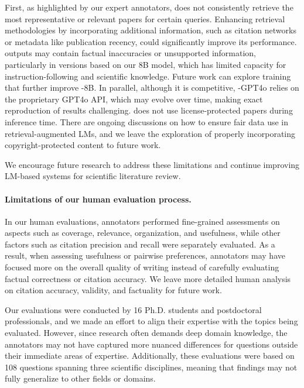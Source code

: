 First, as highlighted by our expert annotators, \model does not consistently retrieve the most representative or relevant papers for certain queries. Enhancing retrieval methodologies by incorporating additional information, such as citation networks or metadata like publication recency, could significantly improve its performance. 
\model outputs may contain factual inaccuracies or unsupported information, particularly in versions based on our 8B model, which has limited capacity for instruction-following and scientific knowledge.  
Future work can explore training that further improve \model-8B. 
In parallel, although it is competitive, \model-GPT4o relies on the proprietary GPT4o API, which may evolve over time, making exact reproduction of results challenging. 
\model does not use license-protected papers during inference time. 
There are ongoing discussions on how to ensure fair data use in retrieval-augmented LMs, and we leave the exploration of properly incorporating copyright-protected content to future work. 

We encourage future research to address these limitations and continue improving LM-based systems for scientific literature review. 



\paragraph{Limitations of our human evaluation process.}
In our human evaluations, annotators performed fine-grained assessments on aspects such as coverage, relevance, organization, and usefulness, while other factors such as citation precision and recall were separately evaluated. As a result, when assessing usefulness or pairwise preferences, annotators may have focused more on the overall quality of writing instead of carefully evaluating factual correctness or citation accuracy. We leave more detailed human analysis on citation accuracy, validity, and factuality for future work.

Our evaluations were conducted by 16 Ph.D. students and postdoctoral professionals, and we made an effort to align their expertise with the topics being evaluated. However, since research often demands deep domain knowledge, the annotators may not have captured more nuanced differences for questions outside their immediate areas of expertise. 
Additionally, these evaluations were based on 108 questions spanning three scientific disciplines, meaning that findings may not fully generalize to other fields or domains. 